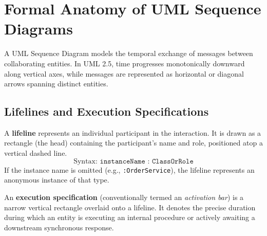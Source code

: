 \section{Formal Anatomy of UML Sequence Diagrams}

A UML Sequence Diagram models the temporal exchange of messages between collaborating entities. In UML 2.5, time progresses monotonically downward along vertical axes, while messages are represented as horizontal or diagonal arrows spanning distinct entities.

\subsection{Lifelines and Execution Specifications}

A \textbf{lifeline} represents an individual participant in the interaction. It is drawn as a rectangle (the head) containing the participant's name and role, positioned atop a vertical dashed line.
\begin{equation}
\text{Syntax: } \texttt{instanceName : ClassOrRole}
\end{equation}
If the instance name is omitted (e.g., \texttt{:OrderService}), the lifeline represents an anonymous instance of that type.

An \textbf{execution specification} (conventionally termed an \textit{activation bar}) is a narrow vertical rectangle overlaid onto a lifeline. It denotes the precise duration during which an entity is executing an internal procedure or actively awaiting a downstream synchronous response.

